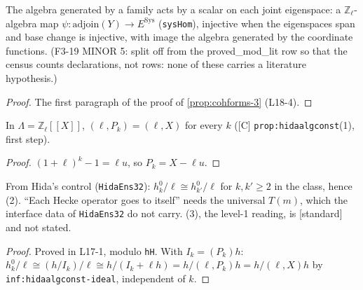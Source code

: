 \begin{lemma}\label{prop:cohforms-3-aux}
  \leanok
  The algebra generated by a family acts by a scalar on each joint eigenspace: a $\mathbb Z_\ell$-algebra map
  $\psi\colon\mathrm{adjoin}(Y)\to E^{\mathrm{Sys}}$ (\texttt{sysHom}), injective when the eigenspaces span and base change is injective,
  with image the algebra generated by the coordinate functions. (F3-19 MINOR 5: split off from the \textsf{proved\_mod\_lit} row so that the census counts declarations, not rows: none of these carries a literature hypothesis.)
\end{lemma}
\begin{proof}
  \leanok
  The first paragraph of the proof of \ref{prop:cohforms-3} (L18-4).
\end{proof}

\begin{lemma}[$(\ell,P_k)=(\ell,X)$ in $\Lambda$]\label{inf:hidaalgconst-ideal}
  \leanok
  In $\Lambda=\mathbb Z_\ell[[X]]$, $(\ell,P_k)=(\ell,X)$ for every $k$ ([C] \texttt{prop:hidaalgconst}(1), first step).
\end{lemma}
\begin{proof}
  \leanok
  $(1+\ell)^k-1=\ell u$, so $P_k=X-\ell u$.
\end{proof}

\begin{proposition}\label{prop:hidaalgconst}
  \leanok
  From Hida's control (\texttt{HidaEns32}): $h^0_k/\ell\cong h^0_{k'}/\ell$ for $k,k'\ge2$ in the class, hence (2).
  ``Each Hecke operator goes to itself'' needs the universal $T(m)$, which the interface data of \texttt{HidaEns32} do not
  carry. (3), the level-1 reading, is \textsf{[standard]} and not stated.
\end{proposition}
\begin{proof}
  \leanok
  Proved in L17-1, modulo \texttt{hH}. With $I_k=(P_k)h$: $h^0_k/\ell\cong(h/I_k)/\ell\cong h/(I_k+\ell h)=h/(\ell,P_k)h=h/(\ell,X)h$
  by \texttt{inf:hidaalgconst-ideal}, independent of $k$.
\end{proof}

